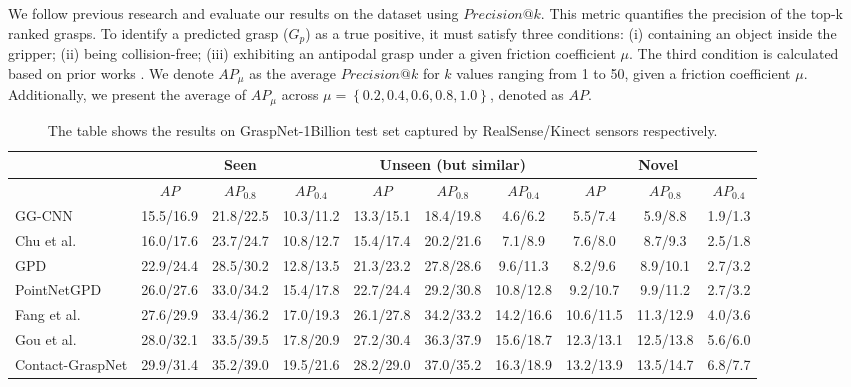 We follow previous research \cite{fang2020graspnet} and evaluate our results on the dataset using $Precision@k$. This metric quantifies the precision of the top-k ranked grasps. To identify a predicted grasp ($G_{p}$) as a true positive, it must satisfy three conditions: (i) containing an object inside the gripper; (ii) being collision-free; (iii) exhibiting an antipodal grasp under a given friction coefficient $\mu$. The third condition is calculated based on prior works \cite{ten2017grasp, fang2020graspnet}. We denote $AP_{\mu}$ as the average $Precision@k$ for $k$ values ranging from 1 to 50, given a friction coefficient $\mu$. Additionally, we present the average of $AP_{\mu}$ across $\mu = \left\lbrace 0.2,0.4,0.6,0.8,1.0 \right\rbrace $, denoted as $AP$.


\begin{table}[h]
\caption{The table shows the results on GraspNet-1Billion test set captured by RealSense/Kinect sensors respectively.}
\label{tab:grasp_detect_eval}
\begin{center}
\begin{tabular}{|l|c|c|c|c|c|c|c|c|c|}
\hline
& \multicolumn{3}{c|}{Seen} & \multicolumn{3}{c|}{Unseen (but similar)} & \multicolumn{3}{c|}{Novel} \\
\hline
& $AP$ & $AP_{0.8}$ & $AP_{0.4}$ & $AP$ & $AP_{0.8}$ & $AP_{0.4}$ & $AP$ & $AP_{0.8}$ & $AP_{0.4}$  \\
\hline
GG-CNN \cite{morrison2018closing} & 15.5/16.9 & 21.8/22.5 & 10.3/11.2 & 13.3/15.1 & 18.4/19.8 & 4.6/6.2 & 5.5/7.4 & 5.9/8.8 & 1.9/1.3 \\
\hline
Chu et al. \cite{chu2018real} & 16.0/17.6 & 23.7/24.7 & 10.8/12.7 & 15.4/17.4 & 20.2/21.6 & 7.1/8.9 & 7.6/8.0 & 8.7/9.3 & 2.5/1.8 \\
\hline
GPD \cite{ten2017grasp} & 22.9/24.4 & 28.5/30.2 & 12.8/13.5 & 21.3/23.2 & 27.8/28.6 & 9.6/11.3 & 8.2/9.6 & 8.9/10.1 & 2.7/3.2 \\
\hline
PointNetGPD \cite{liang2019pointnetgpd} & 26.0/27.6 & 33.0/34.2 & 15.4/17.8 & 22.7/24.4 & 29.2/30.8 & 10.8/12.8 & 9.2/10.7 & 9.9/11.2 & 2.7/3.2 \\
\hline
Fang et al. \cite{fang2020graspnet} & 27.6/29.9 & 33.4/36.2 & 17.0/19.3 & 26.1/27.8 & 34.2/33.2 & 14.2/16.6 & 10.6/11.5 & 11.3/12.9 & 4.0/3.6 \\
\hline
Gou et al. \cite{gou2021rgb} & 28.0/32.1 & 33.5/39.5 & 17.8/20.9 & 27.2/30.4 & 36.3/37.9 & 15.6/18.7 & 12.3/13.1 & 12.5/13.8 & 5.6/6.0 \\
\hline
Contact-GraspNet \cite{sundermeyer2021contact} & 29.9/31.4 & 35.2/39.0 & 19.5/21.6 & 28.2/29.0 & 37.0/35.2 & 16.3/18.9 & 13.2/13.9 & 13.5/14.7 & 6.8/7.7 \\

\end{tabular}
\end{center}
\end{table}
